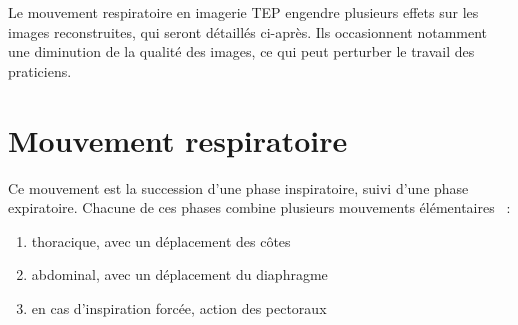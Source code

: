 Le mouvement respiratoire en imagerie TEP engendre plusieurs effets sur les images reconstruites, qui seront détaillés ci-après. Ils occasionnent notamment une diminution de la qualité des images, ce qui peut perturber le travail des praticiens.

\section{Mouvement respiratoire}

Ce mouvement est la succession d'une phase inspiratoire, suivi d'une phase expiratoire. Chacune de ces phases combine plusieurs mouvements élémentaires~\cite{servant2007cours} :
 
\begin{enumerate}
 \item thoracique, avec un déplacement des côtes
 \item abdominal, avec un déplacement du diaphragme
 \item en cas d'inspiration forcée, action des pectoraux
\end{enumerate}

